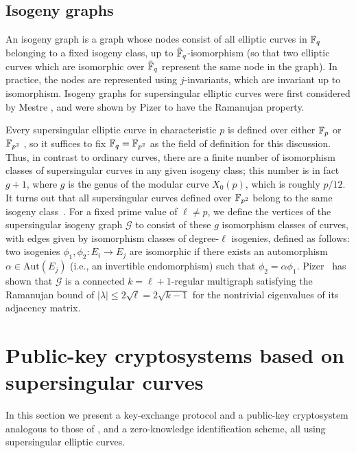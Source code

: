 \subsection{Isogeny graphs}\label{isog_graph} 

An isogeny graph is a graph whose nodes consist of all elliptic curves
in ${\mathbb{F}}_q$ belonging to a fixed isogeny class, up to
$\bar{{\mathbb{F}}}_q$-isomorphism (so that two elliptic curves which are
isomorphic over $\bar{{\mathbb{F}}}_q$ represent the same node in the
graph). In practice, the nodes are represented using $j$-invariants,
which are invariant up to isomorphism. 
Isogeny graphs for supersingular elliptic curves were first considered
by Mestre \cite{Mestre}, and were shown by Pizer \cite{pizer1,pizer2}
to have the Ramanujan property.

Every supersingular elliptic curve in characteristic $p$ is defined
over either ${\mathbb{F}}_p$ or ${\mathbb{F}}_{p^2}$ \cite{Sil}, so it suffices to fix
${\mathbb{F}}_q = {\mathbb{F}}_{p^2}$ as the field of definition for this
discussion. Thus, in contrast to ordinary curves, there are a finite
number of isomorphism classes of supersingular curves in any given isogeny class;
this number is in fact $g+1$, where $g$ is the genus of the modular curve $X_0(p)$,
which is roughly $p/12$. It turns out that all supersingular
curves defined over ${\mathbb{F}}_{p^2}$ belong to the same isogeny
class~\cite{Mestre}. For a fixed prime value of $\ell \neq p$, we
define the vertices of the supersingular isogeny graph $\mathcal{G}$
to consist of these $g$ isomorphism classes of curves, with
edges given by isomorphism classes of degree-$\ell$ isogenies,
defined as follows: two isogenies $\phi_1, \phi_2 \colon E_i \to E_j$
are isomorphic if there exists an automorphism $\alpha \in
\text{Aut}(E_j)$ (i.e., an invertible endomorphism) such that $\phi_2
= \alpha\phi_1$. Pizer~\cite{pizer1,pizer2} has shown that
$\mathcal{G}$ is a connected $k = \ell + 1$-regular multigraph
satisfying the Ramanujan bound of $|\lambda| \leq 2\sqrt{\ell} =
2\sqrt{k - 1}$ for the nontrivial eigenvalues of its adjacency matrix.


\section{Public-key cryptosystems based on supersingular curves}\label{sec:kep}

In this section we present a key-exchange protocol and a public-key
cryptosystem analogous to those of \cite{R&S,Stol}, and a
zero-knowledge identification scheme, all using supersingular elliptic
curves.


